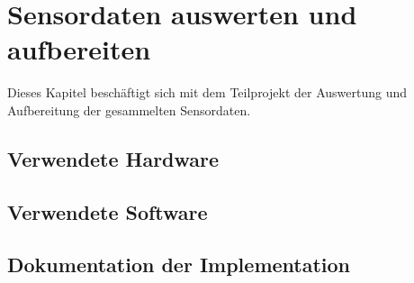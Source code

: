 
\chapter{Sensordaten auswerten und aufbereiten}
Dieses Kapitel beschäftigt sich mit dem Teilprojekt der Auswertung und Aufbereitung der gesammelten Sensordaten.


\section{Verwendete Hardware}


\section{Verwendete Software}


\section{Dokumentation der Implementation}